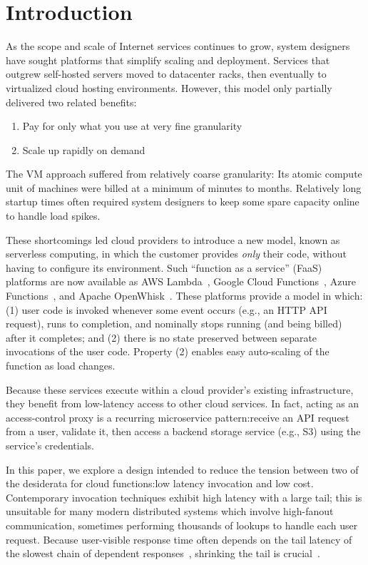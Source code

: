 \section{Introduction}
\label{sec:intro}

As the scope and scale of Internet services continues to grow, system designers
have sought platforms that simplify scaling and deployment.
Services that outgrew self-hosted servers moved to datacenter racks, then
eventually to virtualized cloud hosting environments.
However, this model only partially delivered two related benefits:
\begin{enumerate}
\item Pay for only what you use at very fine granularity
\item Scale up rapidly on demand
\end{enumerate}

The VM approach suffered from relatively coarse granularity:  Its atomic compute unit
of machines were billed at a minimum of minutes to months.  Relatively long startup
times often required system designers to keep some spare capacity online to handle
load spikes.

These shortcomings led cloud providers to introduce a new model, known as
serverless computing, in which the customer provides \textit{only} their code,
without having to configure its environment.   Such ``function as a service''
(FaaS) platforms are now available as AWS Lambda~\cite{www-amazon-lambda}, Google
Cloud Functions~\cite{www-google-cf}, Azure Functions~\cite{www-microsoft-af}, and
Apache OpenWhisk~\cite{www-apache-openwhisk}.  These platforms provide a model in
which: (1)  user code is invoked whenever some event occurs (e.g., an HTTP
API request), runs to completion, and nominally stops running (and being
billed) after it completes; and (2)  there is no state preserved between
separate invocations of the user code.  Property (2) enables easy auto-scaling
of the function as load changes.

Because these services execute within a cloud provider's existing
infrastructure, they benefit from low-latency access to other cloud
services.  In fact, acting as an access-control proxy is a recurring microservice
pattern:\@ receive an API request from a user, validate it, then access
a backend storage service (e.g., S3) using the service's credentials.

In this paper, we explore a design intended to reduce the tension between two of
the desiderata for cloud functions:\@ low latency invocation and low cost.  Contemporary
invocation techniques exhibit high latency with a
large tail; this is
unsuitable for many modern distributed systems which involve
high-fanout communication, sometimes performing thousands of
lookups to handle each user request.  Because user-visible response time often
depends on the tail latency of the slowest chain of dependent
responses~\cite{Dean:cacm2013}, shrinking the tail is crucial~\cite{Jalaparti:sigcomm2013,
Xu:nsdi2013,Li:socc2014,Jeon:asplos2016}.

